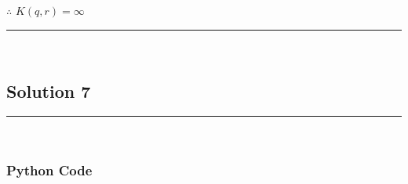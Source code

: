 \documentclass{article}
\begin{document}
\subsubsection*{\normalfont}{$\therefore$ $K(q, r) = \infty$}

\noindent\rule{\textwidth}{0.4pt}\\

\newpage
\subsection*{Solution 7}
\noindent\rule{\textwidth}{0.4pt}\\

\subsubsection*{Python Code}
\end{document}
